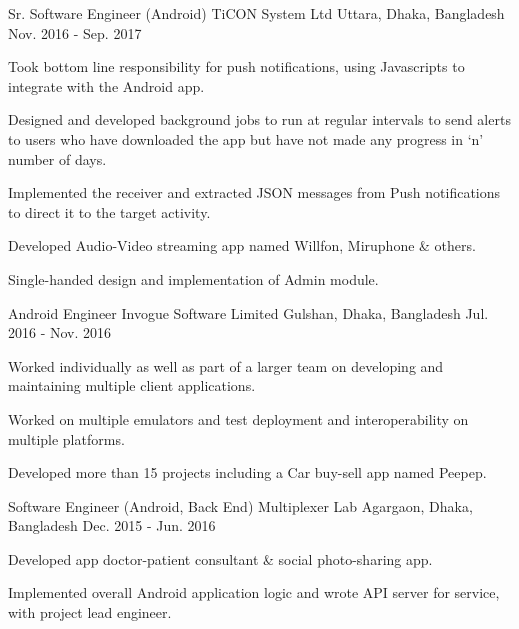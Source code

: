 \begin{cventries}
  \cventry
    {Sr. Software Engineer (Android)} %
    {TiCON System Ltd} %
    {Uttara, Dhaka, Bangladesh} %
    {Nov. 2016 - Sep. 2017} %
    {
      \begin{cvitems} %
        \item {Took bottom line responsibility for push notifications, using Javascripts to integrate with the Android app.}
        \item {Designed and developed background jobs to run at regular intervals to send alerts to users who have downloaded the app but have not made any progress in ‘n’ number of days.}
        \item {Implemented the receiver and extracted JSON messages from Push notifications to direct it to the target activity.}
        \item {Developed Audio-Video streaming app named Willfon, Miruphone \& others.}
        \item {Single-handed design and implementation of Admin module.}
      \end{cvitems}
    }

  \cventry
    {Android Engineer} %
    {Invogue Software Limited} %
    {Gulshan, Dhaka, Bangladesh} %
    {Jul. 2016 - Nov. 2016} %
    {
      \begin{cvitems} %
        \item {Worked individually as well as part of a larger team on developing and maintaining multiple client applications.}
        \item {Worked on multiple emulators and test deployment and interoperability on multiple platforms.}
        \item {Developed more than 15 projects including a Car buy-sell app named Peepep.}
      \end{cvitems}
    }

  \cventry
    {Software Engineer (Android, Back End)} %
    {Multiplexer Lab} %
    {Agargaon, Dhaka, Bangladesh} %
    {Dec. 2015 - Jun. 2016} %
    {
      \begin{cvitems} %
        \item {Developed app doctor-patient consultant \& social photo-sharing app.}
        \item {Implemented overall Android application logic and wrote API server for service, with project lead engineer.}
      \end{cvitems}
    }


\end{cventries}

